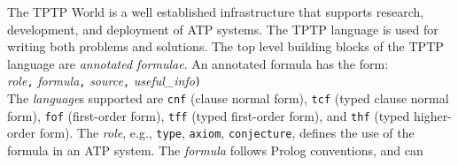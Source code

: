\documentclass[letterpaper]{article}
\newcommand{\smalltt}[1]{\small \texttt{#1}}
\begin{document}
The TPTP World \cite{Sut17} is a well established infrastructure that supports research, 
development, and deployment of ATP systems.
The TPTP language \cite{Sut22-IGPL} is 
used for writing both problems and solutions.
The top level building blocks of the TPTP language are {\em annotated formulae}.
An annotated formula has the form:\\
{\em role}{\tt ,}
{\em formula}{\tt ,}
{\em source}{\tt ,}
{\em useful\_info}{\tt )}\\
The {\em language}s supported are {\smalltt{cnf}} (clause normal form), {\smalltt{tcf}} (typed
clause normal form), {\smalltt{fof}} (first-order form), {\smalltt{tff}} (typed first-order form), 
and {\smalltt{thf}} (typed higher-order form).
The {\em role}, e.g., {\smalltt{type}}, {\smalltt{axiom}}, {\smalltt{conjecture}}, defines the use 
of the formula in an ATP system.
The {\em formula} follows Prolog conventions, and can
\end{document}
